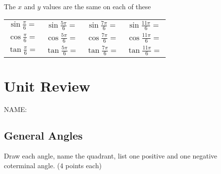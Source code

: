 \documentclass[12pt]{article}
\begin{document}
The $x$ and $y$ values are the same on each of these



\bgroup
\def\arraystretch{3.3}%
\setlength{\tabcolsep}{.4in}
\begin{tabular}{c c c c}

$\sin\frac{\pi}{6}=$ & $\sin\frac{5\pi}{6}=$ & $\sin\frac{7\pi}{6}=$ & $\sin\frac{11\pi}{6}=$ \\

$\cos\frac{\pi}{6}=$ & $\cos\frac{5\pi}{6}=$ & $\cos\frac{7\pi}{6}=$ & $\cos\frac{11\pi}{6}=$ \\

$\tan\frac{\pi}{6}=$ & $\tan\frac{5\pi}{6}=$ & $\tan\frac{7\pi}{6}=$ & $\tan\frac{11\pi}{6}=$ \\

\end{tabular}
\egroup


\section*{Unit Review}

\hfill NAME:\underline{\hspace*{3in}}

\subsection*{General Angles}

Draw each angle, name the quadrant, list one positive and one negative coterminal angle. (4 points each)\\
\end{document}
